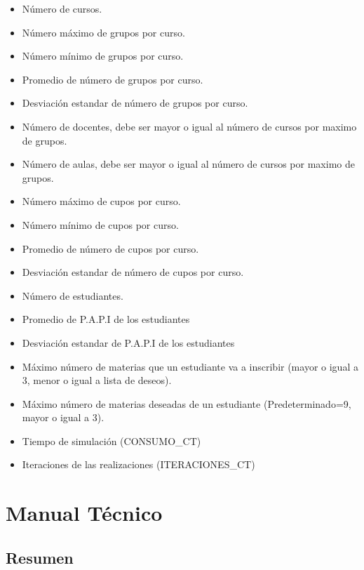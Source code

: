 \documentclass{article}
\begin{document}
\begin{itemize}
  \item Número de cursos.
  \item Número máximo de grupos por curso.
  \item Número mínimo de grupos por curso.
  \item Promedio de número de grupos por curso.
  \item Desviación estandar de número de grupos por curso.
  \item Número de docentes, debe ser mayor o igual al número de cursos por maximo de grupos.
  \item Número de aulas, debe ser mayor o igual al número de cursos por maximo de grupos.
  \item Número máximo de cupos por curso.
  \item Número mínimo de cupos por curso.
  \item Promedio de número de cupos por curso.
  \item Desviación estandar de número de cupos por curso.
  \item Número de estudiantes.
  \item Promedio de P.A.P.I de los estudiantes
  \item Desviación estandar de P.A.P.I de los estudiantes
  \item Máximo número de materias que un estudiante va a inscribir (mayor o igual a 3,
        menor o igual a lista de deseos).
  \item Máximo número de materias deseadas de un estudiante (Predeterminado=9,
        mayor o igual a 3).
  \item Tiempo de simulación (CONSUMO\_CT)
  \item Iteraciones de las realizaciones (ITERACIONES\_CT)
\end{itemize}



\section{Manual Técnico}\label{sec:man_t}

\subsection{Resumen}
\end{document}
